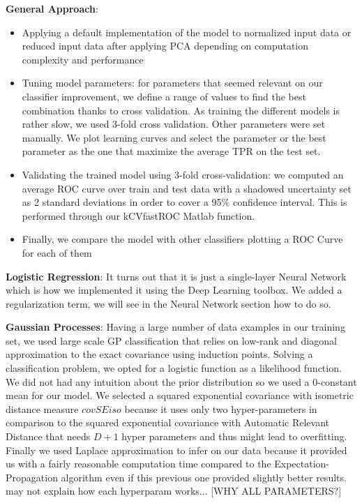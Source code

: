 \documentclass{article}
\begin{document}
   \textbf{General Approach}:
     	\begin{itemize}
		\item Applying a default implementation of the model to normalized input data or reduced input data after applying PCA depending on computation complexity and performance
    		\item Tuning model parameters: for parameters that seemed relevant on our classifier improvement, we define a range of values to find the best combination thanks to cross validation. As training the different models is rather slow, we used 3-fold cross validation. Other parameters were set manually. We plot learning curves and select the parameter or the best parameter as the one that maximize the average TPR on the test set.
		\item Validating the trained model using 3-fold cross-validation: we computed an average ROC curve over train and test data with a shadowed uncertainty set as 2 standard deviations in order to cover a 95\% confidence interval. This is performed through our kCVfastROC Matlab function.
		\item Finally, we compare the model with other classifiers plotting a ROC Curve for each of them
	\end{itemize}

   \textbf{Logistic Regression}: It turns out that it is just a single-layer Neural Network which is how we implemented it using the Deep Learning toolbox. We added a regularization term, we will see in the Neural Network section how to do so.

   \textbf{Gaussian Processes}: Having a large number of data examples in our training set, we used large scale GP classification that relies on low-rank and diagonal approximation to the exact covariance using induction points. Solving a classification problem, we opted for a logistic function as a likelihood function. We did not had any intuition about the prior distribution so we used a 0-constant mean for our model. We selected a squared exponential covariance with isometric distance measure $covSEiso$ because it uses only two hyper-parameters in comparison to the squared exponential covariance with Automatic Relevant Distance that needs $D+1$ hyper parameters and thus might lead to overfitting. Finally we used Laplace approximation to infer on our data because it provided us with a fairly reasonable computation time compared to the Expectation-Propagation algorithm even if this previous one provided slightly better results.
   ~ may not explain how each hyperparam works... [WHY ALL PARAMETERS?]
\end{document}
